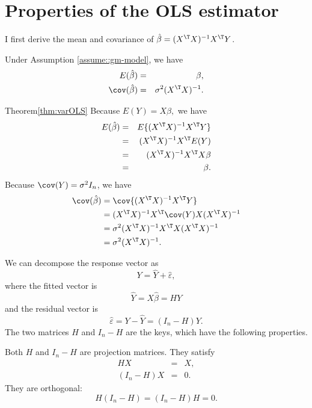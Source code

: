 \section{Properties of the OLS estimator}

I first derive the mean and covariance of $\hat{\beta}=(X^{\T}X)^{-1}X^{\T}Y$.
\begin{theorem}
\label{thm:varOLS}Under Assumption  \ref{assume::gm-model}, we have 
\begin{eqnarray*}
E(\hat{\beta}) &=& \beta,\\ 
\cov(\hat{\beta}) &=&  \sigma^{2}(X^{\T}X)^{-1}.
\end{eqnarray*}
\end{theorem}

\begin{myproof}{Theorem}{\ref{thm:varOLS}}
Because $E(Y)=X\beta,$ we have
\begin{eqnarray*}
E(\hat{\beta}) &=& E\{ (X^{\T}X)^{-1}X^{\T}Y\} \\
 &=& (X^{\T}X)^{-1}X^{\T}E(Y) \\
 &=&(X^{\T}X)^{-1}X^{\T}X\beta \\
 &=&\beta.
\end{eqnarray*}
 Because $\cov(Y)=\sigma^{2}I_{n}$, we have 
\begin{align*}
\cov(\hat{\beta}) & =\cov\{ (X^{\T}X)^{-1}X^{\T}Y\}  \\
&=(X^{\T}X)^{-1}X^{\T}\cov(Y)X(X^{\T}X)^{-1}\\
 & =\sigma^{2}(X^{\T}X)^{-1}X^{\T}X(X^{\T}X)^{-1} \\
 & =\sigma^{2}(X^{\T}X)^{-1}.
\end{align*}
\end{myproof}


We can decompose the response vector as 
\[
Y=\hat{Y}+\hat{\varepsilon},
\]
 where the fitted vector is 
 $$
 \hat{Y}=X\hat{\beta}=HY
 $$ and the
residual vector is 
$$
\hat{\varepsilon}=Y-\hat{Y}=(I_{n}-H)Y.
$$ The two
matrices $H$ and $I_{n}-H$ are the keys, which have the following
properties. 



\begin{lemma}
\label{lem:projectionms}
Both $H$ and $I_{n}-H$ are projection matrices. They satisfy 
\begin{eqnarray*}
HX &=&X,\\ 
(I_{n}-H)X &=& 0 .  
\end{eqnarray*}
They are orthogonal: 
$$
H(I_{n}-H)=(I_{n}-H)H=0.
$$
\end{lemma}

